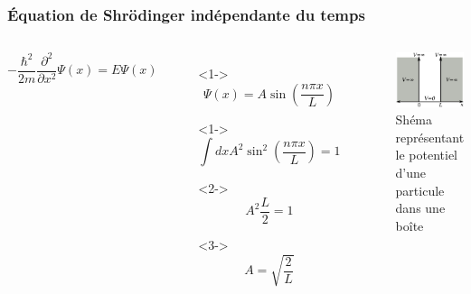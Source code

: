 \documentclass[aspectratio=169]{beamer}
\begin{document}
\begin{frame}
\frametitle{Équation de Shrödinger indépendante du temps}
%
\begin{columns}
%
\begin{equation}\tag{4}
-\frac{\hbar^2}{2m}\frac{\partial^2}{\partial x^2}\Psi(x)=E\Psi(x)
\end{equation} 
%
\begin{itemize}
\item[]<1-> \begin{equation}\tag{5}
\Psi(x)=A\sin(\frac{n\pi x}{L})
\end{equation}  
\item[]<1-> \begin{equation}\tag{6}
\int dx A^2\sin^2(\frac{n\pi x}{L})=1
\end{equation}
\item[]  <2-> \begin{equation}\tag{7}
A^2 \frac{L}{2}=1
\end{equation}
\item[]  <3-> \begin{equation}\tag{7}
A=\sqrt{\frac{2}{L}}
\end{equation}
\end{itemize}
\begin{figure}
\includegraphics[scale=0.4]{Pot}
\caption{Shéma représentant le potentiel d'une particule dans une boîte}
\end{figure}
\end{columns}
%
\end{frame}
\end{document}

